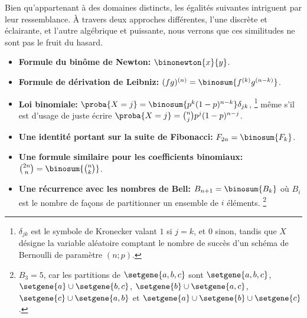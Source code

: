 Bien qu'appartenant à des domaines distincts, les égalités suivantes intriguent par leur ressemblance. 
%
À travers deux approches différentes, l'une discrète et éclairante, et l'autre algébrique et puissante, nous verrons que ces similitudes ne sont pas le fruit du hasard.
%
\begin{itemize}
    \item \textbf{Formule du binôme de Newton:}
    $\binonewton{x}{y}$.


    \item \textbf{Formule de dérivation de Leibniz:}
    $(fg)^{(n)} = \binosum{f^{(k)} g^{(n-k)}}$.


    \item \textbf{Loi binomiale:}
    $\proba{X = j} = \binosum{p^k (1 - p)^{n-k}} \delta_{jk}$,%
    \footnote{
    	$\delta_{jk}$ est le symbole de Kronecker valant $1$ si $j=k$, et $0$ sinon,
		tandis que
		$X$ désigne la variable aléatoire comptant le nombre de succès d'un schéma de Bernoulli de paramètre $(n ; p)$.
    }
    même s'il est d'usage de juste écrire
    $\proba{X = j} =\binom{n}{j} p^j (1 - p)^{n-j}$.


    \item \textbf{Une identité portant sur la suite de Fibonacci:}
    $F_{2n} = \binosum{F_k}$.


    \item \textbf{Une formule similaire pour les coefficients binomiaux:}
    $\binom{2n}{n} = \binosum{\binom{n}{k}}$.


    \item \textbf{Une récurrence avec les nombres de Bell:}
    $B_{n+1} = \binosum{B_k}$ où $B_i$ est le nombre de façons de partitionner un ensemble de $i$ éléments.%
    \footnote{
    	$B_3 = 5$,
    	car les partitions de $\setgene{ a , b , c }$ sont
    	$\setgene{ a , b , c }$,
    	$\setgene{ a } \cup \setgene{ b , c }$,
    	$\setgene{ b } \cup \setgene{ a , c }$,
    	$\setgene{ c } \cup \setgene{ a , b }$
		et
    	$\setgene{ a } \cup \setgene{ b } \cup \setgene{ c }$.
	}
\end{itemize}